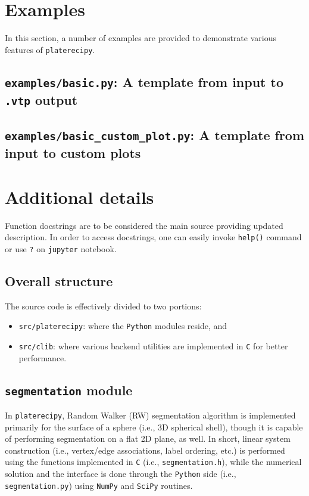 \documentclass[12pt,letterpaper]{article}
\begin{document}
\newpage
\section{Examples}
In this section, a number of examples are provided to demonstrate various features 
of \texttt{platerecipy}.

\subsection{\texttt{examples/basic.py}: A template from input to \texttt{.vtp} output}


\newpage
\subsection{\texttt{examples/basic\_custom\_plot.py}: A template from input to custom plots}


\newpage
\section{Additional details}
Function docstrings are to be considered the main source providing updated description. 
In order to access docstrings, one can easily invoke \texttt{help()} command or use \texttt{?} on
\texttt{jupyter} notebook.


\subsection{Overall structure}
The source code is effectively divided to two portions:
\begin{itemize}
    \item \texttt{src/platerecipy}: where the \texttt{Python} modules reside, and
    \item \texttt{src/clib}: where various backend utilities are implemented in 
    \texttt{C} for better performance.
\end{itemize}

\subsection{\texttt{segmentation} module}
In \texttt{platerecipy}, Random Walker (RW) segmentation algorithm \parencite{grady2006}
is implemented primarily for the surface of a sphere (i.e., 3D spherical shell), 
though it is capable of performing segmentation on a flat 2D plane, as well.
In short, linear system construction (i.e., vertex/edge associations, label ordering, etc.)
is performed using the functions implemented in \texttt{C} (i.e., \texttt{segmentation.h}),
while the numerical solution and the interface is done through the \texttt{Python}
side (i.e., \texttt{segmentation.py}) using \texttt{NumPy} \parencite{numpy} and \texttt{SciPy}
\parencite{scipy} routines.
\end{document}
